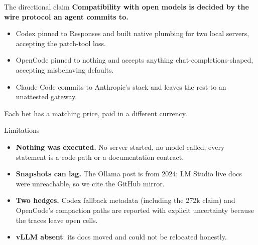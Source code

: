 \documentclass[aspectratio=169,11pt]{beamer}
\begin{document}
\begin{frame}{The directional claim}
  \textbf{Compatibility with open models is decided by the wire protocol
  an agent commits to.}

  \vspace{0.6em}
  \begin{itemize}
    \item \textcolor{nativecol}{Codex} pinned to Responses and built
    native plumbing for two local servers, accepting the patch-tool loss.
    \item \textcolor{genericcol}{OpenCode} pinned to nothing and accepts
    anything chat-completions-shaped, accepting misbehaving defaults.
    \item \textcolor{unattcol}{Claude Code} commits to Anthropic's stack
    and leaves the rest to an unattested gateway.
  \end{itemize}

  \vspace{0.6em}
  Each bet has a matching price, paid in a different currency.
\end{frame}

\begin{frame}{Limitations}
  \begin{itemize}
    \item \textbf{Nothing was executed.} No server started, no model
    called; every statement is a code path or a documentation contract.
    \item \textbf{Snapshots can lag.} The Ollama post is from 2024; LM
    Studio live docs were unreachable, so we cite the GitHub mirror.
    \item \textbf{Two hedges.} Codex fallback metadata (including the
    272k claim) and OpenCode's compaction paths are reported with
    explicit uncertainty because the traces leave open cells.
    \item \textbf{vLLM absent}: its docs moved and could not be
    relocated honestly.
  \end{itemize}
\end{frame}
\end{document}
